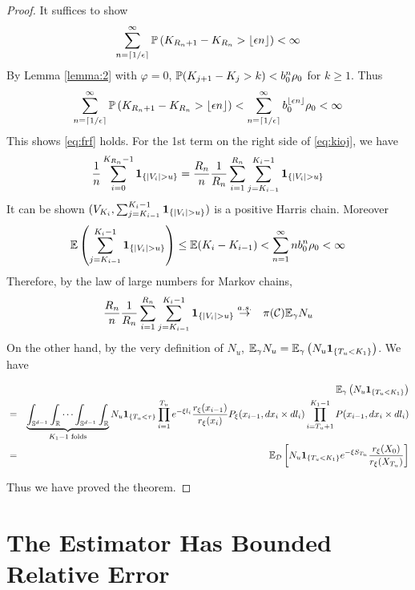 \documentclass[aoas,preprint]{imsart}
\numberwithin{equation}{section}
\theoremstyle{plain}
\begin{document}
\begin{proof}
  It suffices to show
  \[
  \sum_{n=\ceil{1/\epsilon}}^\infty \P\left(
    {K_{R_n + 1} - K_{R_n}} > \floor{\epsilon n}
  \right) < \infty
  \]
  By Lemma \ref{lemma:2} with $\varphi = 0$,
  $\P(K_{j + 1} - K_j > k) < b_0^n \rho_0$ for $k \geq 1$.
  Thus
  \[
    \sum_{n=\ceil{1/\epsilon}}^\infty \P\left(
    {K_{R_n + 1} - K_{R_n}} > \floor{\epsilon n}
  \right)
  <
  \sum_{n=\ceil{1/\epsilon}}^\infty b_0^{\floor{\epsilon n}} \rho_0 < \infty
  \]
  This shows \eqref{eq:frf} holds.
  For the 1st term on the right side of \eqref{eq:kioj}, we have
  \[
  {1 \over n} \sum_{i=0}^{K_{R_n}-1} \1{|V_i| > u}
    =
    {R_n \over n} {1 \over R_n} \sum_{i=1}^{R_n}
    \sum_{j=K_{i-1}}^{K_i-1}\1{|V_i| > u}
  \]
  It can be shown $(V_{K_i}, \sum_{j=K_{i-1}}^{K_i-1}\1{|V_i| > u})$
  is a positive Harris chain. Moreover
  \[
  \E \left(
    \sum_{j=K_{i-1}}^{K_i-1}\1{|V_i| > u}
  \right)
  \leq
  \E (K_i - K_{i-1}) < \sum_{n=1}^\infty n b_0^n \rho_0 < \infty
  \]
  Therefore, by the law of large numbers for Markov chains,
  \begin{eqnarray*}
    {R_n \over n} {1 \over R_n} \sum_{i=1}^{R_n}
    \sum_{j=K_{i-1}}^{K_i-1}\1{|V_i| > u}
    &\overset{a.s.}{\to}& \pi(\mathcal C) \E_\gamma N_u
  \end{eqnarray*}
  On the other hand, by the very definition of $N_u$,
  $\E_\gamma N_u = \E_\gamma \left( N_u \1{T_u < K_1}\right)$. We have
  \begin{small}
    \begin{eqnarray*}
      && \E_\gamma \left( N_u \1{T_u < K_1}\right) \\
      &=&
      \underbrace{
        \int_{\sphere^{d-1}} \int_{\reals}
        \cdots
        \int_{\sphere^{d-1}} \int_{\reals}
      }_{K_1 - 1\text{ folds}}
      N_u \1{T_u < \tau}
      \prod_{i=1}^{T_u} e^{-\xi l_i}
      {r_\xi(x_{i-1}) \over r_\xi(x_{i})}P_\xi(x_{i-1}, dx_i \times dl_i)
      \prod_{i=T_u+1}^{K_1 - 1} P(x_{i-1}, dx_i \times d l_i) \\
      &=&
      \E_{\mathcal D}
      \left[
        N_u \1{T_u < K_1} e^{-\xi S_{T_u}}
        {r_\xi(X_0)
          \over
          r_\xi(X_{T_u})
        }
      \right]
    \end{eqnarray*}
  \end{small}
  Thus we have proved the theorem.
\end{proof}

\section{The Estimator Has Bounded Relative
  Error}\label{sec:efficiency}
\end{document}

